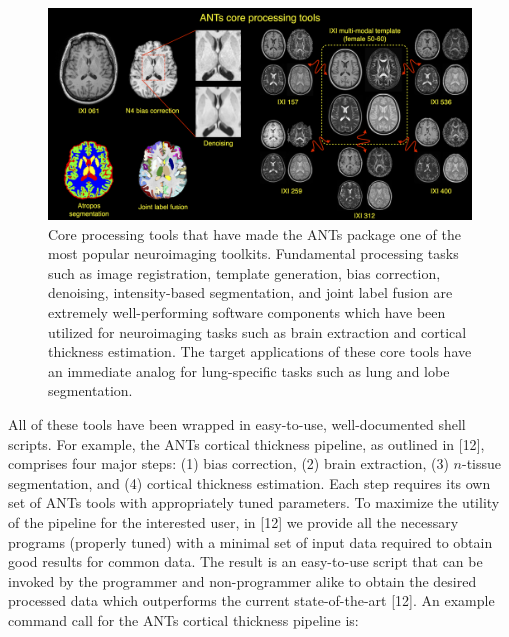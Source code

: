 \documentclass[11pt,]{article}
\begin{document}
\begin{figure}[htbp]
\centering
\includegraphics{Figs/coreANtsToolsNeuro.png}
\caption{Core processing tools that have made the ANTs package one of
the most popular neuroimaging toolkits. Fundamental processing tasks
such as image registration, template generation, bias correction,
denoising, intensity-based segmentation, and joint label fusion are
extremely well-performing software components which have been utilized
for neuroimaging tasks such as brain extraction and cortical thickness
estimation. The target applications of these core tools have an
immediate analog for lung-specific tasks such as lung and lobe
segmentation.}
\end{figure}

All of these tools have been wrapped in easy-to-use, well-documented
shell scripts. For example, the ANTs cortical thickness pipeline, as
outlined in {[}12{]}, comprises four major steps: (1) bias correction,
(2) brain extraction, (3) $n$-tissue segmentation, and (4) cortical
thickness estimation. Each step requires its own set of ANTs tools with
appropriately tuned parameters. To maximize the utility of the pipeline
for the interested user, in {[}12{]} we provide all the necessary
programs (properly tuned) with a minimal set of input data required to
obtain good results for common data. The result is an easy-to-use script
that can be invoked by the programmer and non-programmer alike to obtain
the desired processed data which outperforms the current
state-of-the-art {[}12{]}. An example command call for the ANTs cortical
thickness pipeline is:
\end{document}

